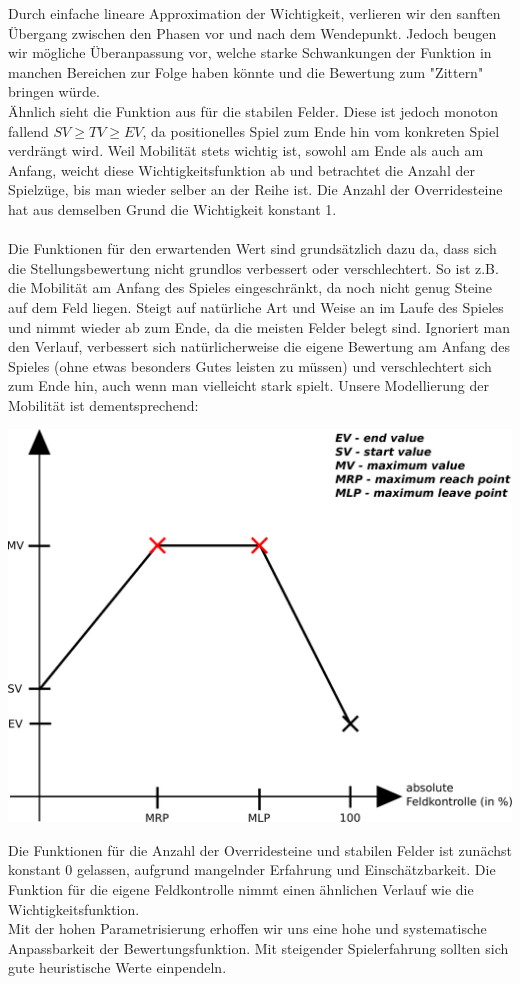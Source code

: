 Durch einfache lineare Approximation der Wichtigkeit, verlieren wir den sanften Übergang zwischen den Phasen vor und nach dem Wendepunkt. Jedoch beugen wir mögliche Überanpassung vor, welche starke Schwankungen der Funktion in manchen Bereichen zur Folge haben könnte und die Bewertung zum "Zittern" bringen würde.\\
Ähnlich sieht die Funktion aus für die stabilen Felder. Diese ist jedoch monoton fallend $SV \geq TV \geq EV$, da positionelles Spiel zum Ende hin vom konkreten Spiel verdrängt wird. Weil Mobilität stets wichtig ist, sowohl am Ende als auch am Anfang, weicht diese Wichtigkeitsfunktion ab und betrachtet die Anzahl der Spielzüge, bis man wieder selber an der Reihe ist. Die Anzahl der Overridesteine hat aus demselben Grund die Wichtigkeit konstant 1.\\\\
Die Funktionen für den erwartenden Wert sind grundsätzlich dazu da, dass sich die Stellungsbewertung nicht grundlos verbessert oder verschlechtert. So ist z.B. die Mobilität am Anfang des Spieles eingeschränkt, da noch nicht genug Steine auf dem Feld liegen. Steigt auf natürliche Art und Weise an im Laufe des Spieles und nimmt wieder ab zum Ende, da die meisten Felder belegt sind. Ignoriert man den Verlauf, verbessert sich natürlicherweise die eigene Bewertung am Anfang des Spieles (ohne etwas besonders Gutes leisten zu müssen) und verschlechtert sich zum Ende hin, auch wenn man vielleicht stark spielt. Unsere Modellierung der Mobilität ist dementsprechend:
\begin{center}
\includegraphics[scale=0.15]{ExpectedValueFunction.pdf}
\end{center}
Die Funktionen für die Anzahl der Overridesteine und stabilen Felder ist zunächst konstant 0 gelassen, aufgrund mangelnder Erfahrung und Einschätzbarkeit. Die Funktion für die eigene Feldkontrolle nimmt einen ähnlichen Verlauf wie die Wichtigkeitsfunktion.\\
Mit der hohen Parametrisierung erhoffen wir uns eine hohe und systematische Anpassbarkeit der Bewertungsfunktion. Mit steigender Spielerfahrung sollten sich gute heuristische Werte einpendeln.
